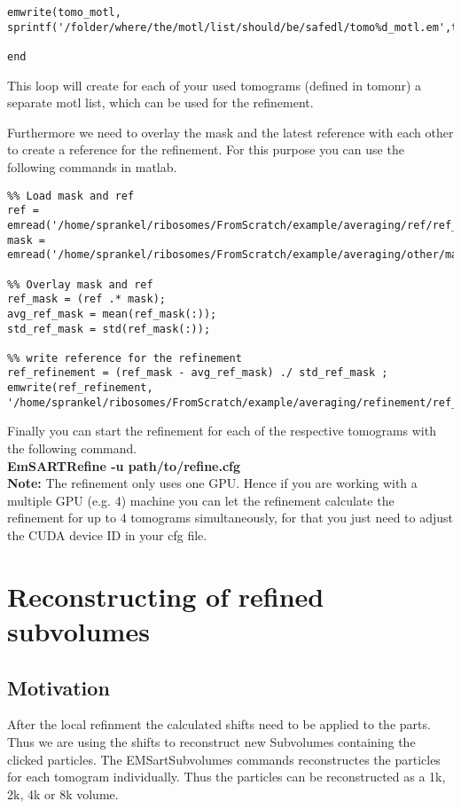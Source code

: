 \documentclass[12pt,a4paper]{scrartcl}
\begin{document}
{\begin{lstlisting}
emwrite(tomo_motl, sprintf('/folder/where/the/motl/list/should/be/safedl/tomo%d_motl.em',tomonr(i)));

end 
\end{lstlisting}

This loop will create for each of your used tomograms (defined in tomonr)  a separate motl list, which can be used for the refinement. 

Furthermore we need to overlay the mask and the latest reference with each other to create a reference for the refinement. For this purpose you can use the following commands in matlab.

\begin{lstlisting}
%% Load mask and ref
ref = emread('/home/sprankel/ribosomes/FromScratch/example/averaging/ref/ref_10.em'); 
mask = emread('/home/sprankel/ribosomes/FromScratch/example/averaging/other/mask_128_30_3.em');

%% Overlay mask and ref
ref_mask = (ref .* mask);
avg_ref_mask = mean(ref_mask(:));
std_ref_mask = std(ref_mask(:));

%% write reference for the refinement
ref_refinement = (ref_mask - avg_ref_mask) ./ std_ref_mask ;
emwrite(ref_refinement, '/home/sprankel/ribosomes/FromScratch/example/averaging/refinement/ref_refinement.em'); 
\end{lstlisting}

Finally you can start the refinement for each of the respective tomograms with the following command.\\

\textbf{EmSARTRefine -u path/to/refine.cfg}\\

\textbf{Note:} The refinement only uses one GPU. Hence if you are working with a multiple GPU (e.g. 4) machine you can let the refinement calculate the refinement for up to 4 tomograms simultaneously, for that you just need to adjust the CUDA device ID in your cfg file.  

\section{Reconstructing of refined subvolumes}
\label{Reconstructing of refined subvolumes}
\subsection{Motivation}
After the local refinment the calculated shifts need to be applied to the parts. Thus we are using the shifts to reconstruct new Subvolumes containing the clicked particles. The EMSartSubvolumes commands reconstructes the particles for each tomogram individually. Thus the particles can be reconstructed as a 1k, 2k, 4k or 8k volume. 
}
\end{document}
